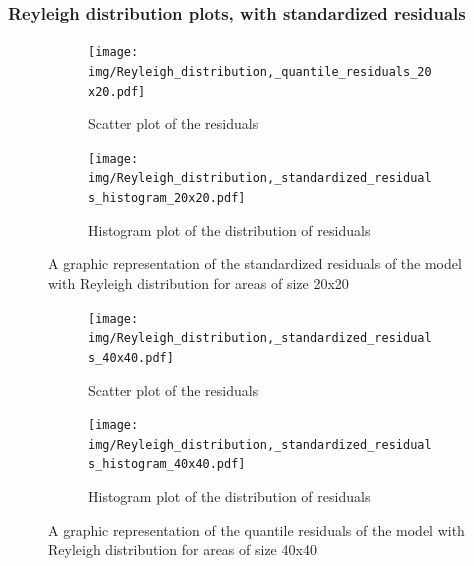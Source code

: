 \documentclass[12pt,a4paper,twoside]{article}
\begin{document}
\subsubsection{Reyleigh distribution plots, with standardized residuals}
\label{sssec:reyleighstandardized}
\begin{figure}[!ht]
    \begin{subfigure}{.45\textwidth}
        \centering
        \texttt{[image: img/Reyleigh\_distribution,\_quantile\_residuals\_20x20.pdf]}
        \caption{Scatter plot of the residuals}
        \label{fig:reyleighstandardizedscatter20}
    \end{subfigure}
    \begin{subfigure}{.45\textwidth}
        \centering
        \texttt{[image: img/Reyleigh\_distribution,\_standardized\_residuals\_histogram\_20x20.pdf]}
        \caption{Histogram plot of the distribution of residuals}
        \label{fig:reyleighstandardizedhist20}
    \end{subfigure}
    \caption{A graphic representation of the standardized residuals of the model with Reyleigh
    distribution for areas of size 20x20}
    \label{fig:reyleighstandardizedfig20}
\end{figure}

\begin{figure}[!ht]
    \begin{subfigure}{.45\textwidth}
        \centering
        \texttt{[image: img/Reyleigh\_distribution,\_standardized\_residuals\_40x40.pdf]}
        \caption{Scatter plot of the residuals}
        \label{fig:reyleighstandardizedscatter40}
    \end{subfigure}
    \begin{subfigure}{.45\textwidth}
        \centering
        \texttt{[image: img/Reyleigh\_distribution,\_standardized\_residuals\_histogram\_40x40.pdf]}
        \caption{Histogram plot of the distribution of residuals}
        \label{fig:reyleighstandardizedhist40}
    \end{subfigure}
    \caption{A graphic representation of the quantile residuals of the model with Reyleigh
    distribution for areas of size 40x40}
    \label{fig:reyleighstandardizedfig40}
\end{figure}

\newpage
\end{document}
